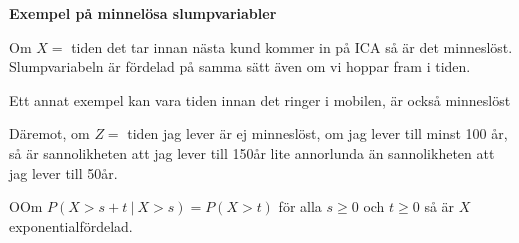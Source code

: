 \par\bigskip
\noindent\textbf{Exempel på minnelösa slumpvariabler}\par
\noindent Om $X = $ tiden det tar innan nästa kund kommer in på ICA så är det minneslöst. Slumpvariabeln är fördelad på samma sätt även om vi hoppar fram i tiden. 
\par\bigskip
\noindent Ett annat exempel kan vara tiden innan det ringer i mobilen, är också minneslöst
\par\bigskip
\noindent Däremot, om $Z = $ tiden jag lever är ej minneslöst, om jag lever till minst 100 år, så är sannolikheten att jag lever till 150år lite annorlunda än sannolikheten att jag lever till 50år. 
\newpage
\begin{theo}
  OOm $P(X>s+t\:|\:X>s) = P(X>t)$ för alla $s\geq0$ och $t\geq0$ så är $X$ exponentialfördelad.
\end{theo}
\par\bigskip
